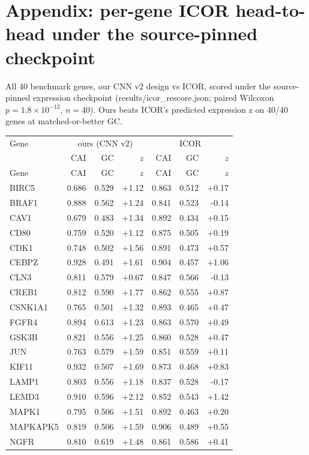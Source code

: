 \section{Appendix: per-gene ICOR head-to-head under the source-pinned checkpoint}
All 40 benchmark genes, our CNN v2 design vs ICOR, scored under the
source-pinned expression checkpoint (results/icor\_rescore.json; paired
Wilcoxon $p=1.8\times10^{-12}$, $n=40$). Ours beats ICOR's predicted
expression z on 40/40 genes at matched-or-better GC.
\begin{center}\small
\begin{longtable}{lrrrrrr}
Gene & \multicolumn{3}{c}{ours (CNN v2)} & \multicolumn{3}{c}{ICOR}\\
 & CAI & GC & $z$ & CAI & GC & $z$\\\hline
\endfirsthead
Gene & CAI & GC & $z$ & CAI & GC & $z$\\\hline
\endhead
BIRC5 & 0.686 & 0.529 & +1.12 & 0.863 & 0.512 & +0.17\\
BRAF1 & 0.888 & 0.562 & +1.24 & 0.841 & 0.523 & -0.14\\
CAV1 & 0.679 & 0.483 & +1.34 & 0.892 & 0.434 & +0.15\\
CD80 & 0.759 & 0.520 & +1.12 & 0.875 & 0.505 & +0.19\\
CDK1 & 0.748 & 0.502 & +1.56 & 0.891 & 0.473 & +0.57\\
CEBPZ & 0.928 & 0.491 & +1.61 & 0.904 & 0.457 & +1.06\\
CLN3 & 0.811 & 0.579 & +0.67 & 0.847 & 0.566 & -0.13\\
CREB1 & 0.812 & 0.590 & +1.77 & 0.862 & 0.555 & +0.87\\
CSNK1A1 & 0.765 & 0.501 & +1.32 & 0.893 & 0.465 & +0.47\\
FGFR4 & 0.894 & 0.613 & +1.23 & 0.863 & 0.570 & +0.49\\
GSK3B & 0.821 & 0.556 & +1.25 & 0.860 & 0.528 & +0.47\\
JUN & 0.763 & 0.579 & +1.59 & 0.851 & 0.559 & +0.11\\
KIF11 & 0.932 & 0.507 & +1.69 & 0.873 & 0.468 & +0.83\\
LAMP1 & 0.803 & 0.556 & +1.18 & 0.837 & 0.528 & -0.17\\
LEMD3 & 0.910 & 0.596 & +2.12 & 0.852 & 0.543 & +1.42\\
MAPK1 & 0.795 & 0.506 & +1.51 & 0.892 & 0.463 & +0.20\\
MAPKAPK5 & 0.819 & 0.506 & +1.59 & 0.906 & 0.489 & +0.55\\
NGFR & 0.810 & 0.619 & +1.48 & 0.861 & 0.586 & +0.41\\

\end{longtable}
\end{center}
